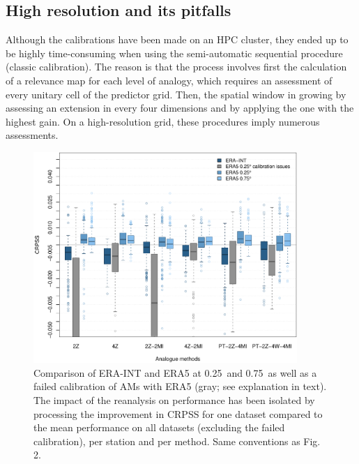 \documentclass[alpha-refs]{wiley-article}
\begin{document}
\subsection{High resolution and its pitfalls}
\label{sec:results_hires}

Although the calibrations have been made on an HPC cluster, they ended up to be highly time-consuming when using the semi-automatic sequential procedure (classic calibration). The reason is that the process involves first the calculation of a relevance map for each level of analogy, which requires an assessment of every unitary cell of the predictor grid. Then, the spatial window in growing by assessing an extension in every four dimensions and by applying the one with the highest gain. On a high-resolution grid, these procedures imply numerous assessments.

\begin{figure}[bt]
	\centering
	\includegraphics[width=100mm]{figures/boxplot-resol-diff.pdf}
	\caption{Comparison of ERA-INT and ERA5 at 0.25\degree\ and 0.75\degree\ as well as a failed calibration of AMs with ERA5 (gray; see explanation in text). The impact of the reanalysis on performance has been isolated by processing the improvement in CRPSS for one dataset compared to the mean performance on all datasets (excluding the failed calibration), per station and per method. Same conventions as Fig. 2.}
	\label{fig:resolution}
\end{figure}
\end{document}
